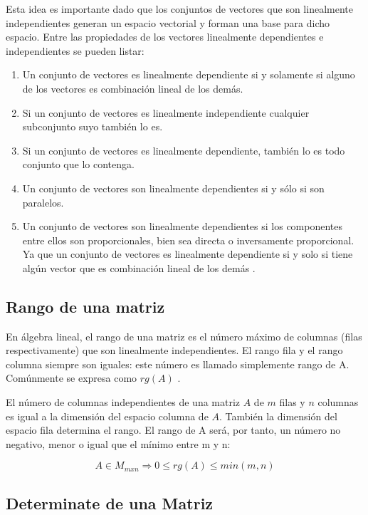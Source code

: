 Esta idea es importante dado que los conjuntos de vectores que son linealmente independientes generan un espacio vectorial y 
forman una base para dicho espacio. Entre las propiedades de los vectores linealmente dependientes e independientes se pueden 
listar:
\begin{enumerate}
   \item Un conjunto de vectores es linealmente dependiente si y solamente si alguno de los vectores es combinación lineal de 
        los demás.
    \item Si un conjunto de vectores es linealmente independiente cualquier subconjunto suyo también lo es.
    \item Si un conjunto de vectores es linealmente dependiente, también lo es todo conjunto que lo contenga.
    \item Un conjunto de vectores son linealmente dependientes si y sólo si son paralelos.
    \item Un conjunto de vectores son linealmente dependientes si los componentes entre ellos son proporcionales, bien sea 
        directa o inversamente proporcional. Ya que un conjunto de vectores es linealmente dependiente si y solo si tiene algún
        vector que es combinación lineal de los demás \cite{MatrixDep}.
\end{enumerate}

\subsection{Rango de una matriz}

En álgebra lineal, el rango de una matriz es el número máximo de columnas (filas respectivamente) que son linealmente 
independientes. El rango fila y el rango columna siempre son iguales: este número es llamado simplemente rango de A.
Comúnmente se expresa como $rg(A)$ \cite{MatrixRg}.

El número de columnas independientes de una matriz $A$ de $m$ filas y $n$ columnas es igual a la dimensión del espacio columna
de $A$. También la dimensión del espacio fila determina el rango. El rango de A será, por tanto, un número no negativo, menor
o igual que el mínimo entre m y n:

\begin{equation}
    A \in M_{mxn} \Rightarrow 0 \le rg(A) \le min(m, n)
\end{equation}

\subsection{Determinate de una Matriz}

